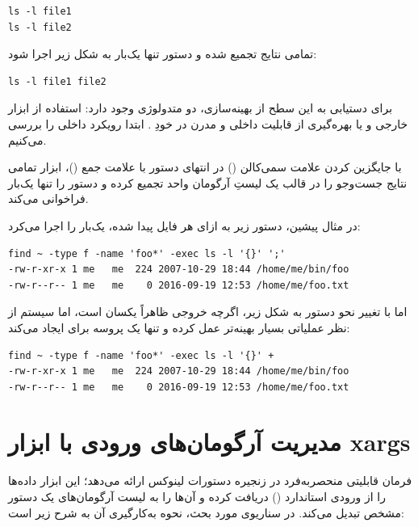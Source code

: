 \begin{latin}
\begin{lstlisting}
ls -l file1
ls -l file2
\end{lstlisting}
\end{latin}

تمامی نتایج تجمیع شده و دستور تنها یک‌بار به شکل زیر اجرا شود:

\begin{latin}
\begin{lstlisting}
ls -l file1 file2
\end{lstlisting}
\end{latin}

برای دستیابی به این سطح از بهینه‌سازی، دو متدولوژی وجود دارد: استفاده از ابزار خارجی  و یا بهره‌گیری از قابلیت داخلی و مدرن در خودِ . ابتدا رویکرد داخلی را بررسی می‌کنیم.

با جایگزین کردن علامت سمی‌کالن (\cmd{;}) در انتهای دستور با علامت جمع (\cmd{+})، ابزار  تمامی نتایج جست‌وجو را در قالب یک لیستِ آرگومان واحد تجمیع کرده و دستور را تنها یک‌بار فراخوانی می‌کند.

در مثال پیشین، دستور زیر به ازای هر فایل پیدا شده، یک‌بار  را اجرا می‌کرد:

\begin{latin}
\begin{lstlisting}
find ~ -type f -name 'foo*' -exec ls -l '{}' ';'
-rw-r-xr-x 1 me   me  224 2007-10-29 18:44 /home/me/bin/foo
-rw-r--r-- 1 me   me    0 2016-09-19 12:53 /home/me/foo.txt
\end{lstlisting}
\end{latin}

اما با تغییر نحو دستور به شکل زیر، اگرچه خروجی ظاهراً یکسان است، اما سیستم از نظر عملیاتی بسیار بهینه‌تر عمل کرده و تنها یک پروسه برای  ایجاد می‌کند:

\begin{latin}
\begin{lstlisting}
find ~ -type f -name 'foo*' -exec ls -l '{}' +
-rw-r-xr-x 1 me   me  224 2007-10-29 18:44 /home/me/bin/foo
-rw-r--r-- 1 me   me    0 2016-09-19 12:53 /home/me/foo.txt
\end{lstlisting}
\end{latin}

\section{مدیریت آرگومان‌های ورودی با ابزار xargs}

فرمان  قابلیتی منحصربه‌فرد در زنجیره دستورات لینوکس ارائه می‌دهد؛ این ابزار داده‌ها را از ورودی استاندارد () دریافت کرده و آن‌ها را به لیست آرگومان‌های یک دستور مشخص تبدیل می‌کند. در سناریوی مورد بحث، نحوه به‌کارگیری آن به شرح زیر است:

